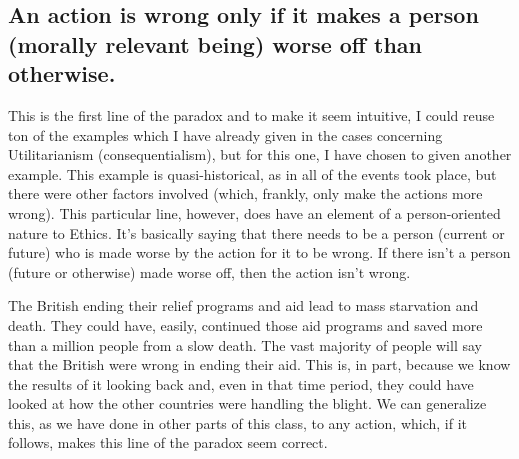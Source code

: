 \subsection{An action is wrong only if it makes a person (morally relevant being) worse off than otherwise.}

This is the first line of the paradox and to make it seem intuitive, I could reuse ton of the examples which I have already given in the cases concerning Utilitarianism (consequentialism), but for this one, I have chosen to given another example. This example is quasi-historical, as in all of the events took place, but there were other factors involved (which, frankly, only make the actions more wrong). This particular line, however, does have an element of a person-oriented nature to Ethics. It's basically saying that there needs to be a person (current or future) who is made worse by the action for it to be wrong. If there isn't a person (future or otherwise) made worse off, then the action isn't wrong. 


The British ending their relief programs and aid lead to mass starvation and death. They could have, easily, continued those aid programs and saved more than a million people from a slow death. The vast majority of people will say that the British were wrong in ending their aid. This is, in part, because we know the results of it looking back and, even in that time period, they could have looked at how the other countries were handling the blight. We can generalize this, as we have done in other parts of this class, to any action, which, if it follows, makes this line of the paradox seem correct. 

